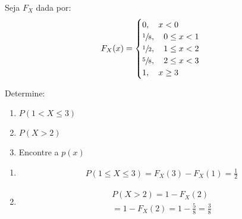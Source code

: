        \begin{example}
       Seja $F_{X}$ dada por:
         \begin{align*}
           F_{X}(x)=\begin{cases} 
             0, \quad x<0 \\
             \sfrac{1}{8},\quad 0 \le x <1 \\
             \sfrac{1}{2}, \quad 1 \le x < 2 \\
             \sfrac{5}{8}, \quad 2 \le x < 3 \\
             1,\quad  x \geq 3
           \end{cases}
         \end{align*}

         Determine: 
         \begin{enumerate}[label=(\alph*)]
           \item $P(1 < X \le 3)$
           \item $P(X>2)$
           \item Encontre a $p(x)$
         \end{enumerate}
         \begin{enumerate}[label= (\alph*)]
           \item 
             \begin{align*}
               P(1 \le X \le 3)= F_{X}(3) - F_{X}(1) = \frac{1}{2}
             \end{align*}
           \item 
             \begin{align*}
               P( X > 2)=1 - F_{X}(2) \\
               = 1- F_{X}(2)= 1 - \frac{5}{8}= \frac{3}{8}
             \end{align*}


\end{enumerate}
\end{example}
